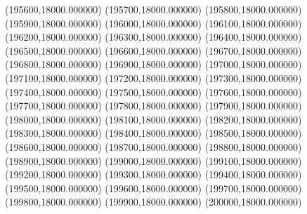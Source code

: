 (195600,18000.000000)
(195700,18000.000000)
(195800,18000.000000)
(195900,18000.000000)
(196000,18000.000000)
(196100,18000.000000)
(196200,18000.000000)
(196300,18000.000000)
(196400,18000.000000)
(196500,18000.000000)
(196600,18000.000000)
(196700,18000.000000)
(196800,18000.000000)
(196900,18000.000000)
(197000,18000.000000)
(197100,18000.000000)
(197200,18000.000000)
(197300,18000.000000)
(197400,18000.000000)
(197500,18000.000000)
(197600,18000.000000)
(197700,18000.000000)
(197800,18000.000000)
(197900,18000.000000)
(198000,18000.000000)
(198100,18000.000000)
(198200,18000.000000)
(198300,18000.000000)
(198400,18000.000000)
(198500,18000.000000)
(198600,18000.000000)
(198700,18000.000000)
(198800,18000.000000)
(198900,18000.000000)
(199000,18000.000000)
(199100,18000.000000)
(199200,18000.000000)
(199300,18000.000000)
(199400,18000.000000)
(199500,18000.000000)
(199600,18000.000000)
(199700,18000.000000)
(199800,18000.000000)
(199900,18000.000000)
(200000,18000.000000)
